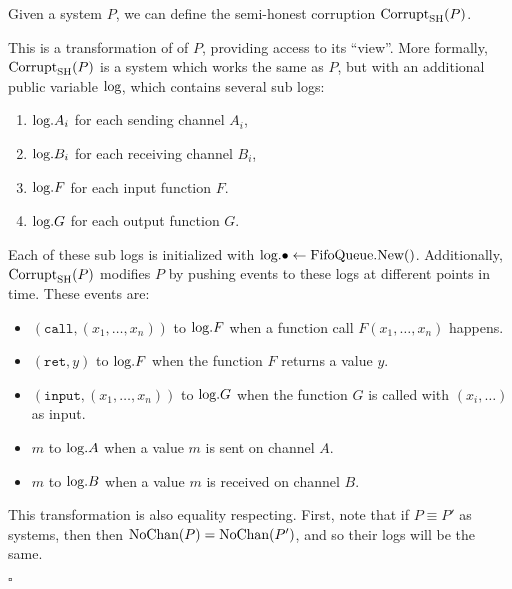 \begin{definition}
Given a system $P$, we can define
the semi-honest corruption $\text{Corrupt}_{\text{SH}}(P)$.

This is a transformation of
of $P$, providing access to its ``view''.
More formally, $\text{Corrupt}_{\text{SH}}(P)$ is a system which works the same
as $P$, but with an additional public variable $\text{log}$,
which contains several sub logs:
\begin{enumerate}
  \item $\text{log}.{A_i}$ for each sending channel $A_i$,
  \item $\text{log}.{B_i}$ for each receiving channel $B_i$,
  \item $\text{log}.F$ for each input function $F$.
  \item $\text{log}.G$ for each output function $G$.
\end{enumerate}
Each of these sub logs is initialized with ${\text{log}.\bullet \gets \text{FifoQueue.New()}}$.
Additionally, $\text{Corrupt}_{\text{SH}}(P)$ modifies $P$ by pushing events to these
logs at different points in time.
These events are:
\begin{itemize}
\item $(\texttt{call}, (x_1, \ldots, x_n))$ to $\text{log}.F$ when a function call $F(x_1, \ldots, x_n)$ happens.
\item $(\texttt{ret}, y)$ to $\text{log}.F$ when the function $F$ returns a value $y$.
\item $(\texttt{input}, (x_1, \ldots, x_n))$ to $\text{log}.G$ when the function $G$ is called with $(x_i, \ldots)$ as input.
\item $m$ to $\text{log}.A$ when a value $m$ is sent on channel $A$.
\item $m$ to $\text{log}.B$ when a value $m$ is received on channel $B$.
\end{itemize}

This transformation is also equality respecting.
First, note that if $P \equiv P'$ as systems, then
then $\text{NoChan}(P) = \text{NoChan}(P')$, and so their logs will be the same.

$\square$
\end{definition}

